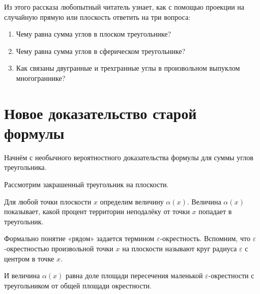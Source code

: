 \documentclass[12pt]{article} %
\theoremstyle{definition} %
\begin{document}
Из этого рассказа любопытный читатель узнает, как с помощью проекции на случайную прямую или плоскость ответить на три вопроса:

\begin{enumerate}
\item Чему равна сумма углов в плоском треугольнике?

\item Чему равна сумма углов в сферическом треугольнике?

\item Как связаны двугранные и трехгранные углы в произвольном выпуклом многограннике?
\end{enumerate}


\section{Новое доказательство старой формулы}

Начнём с необычного вероятностного доказательства формулы для суммы углов треугольника. 

Рассмотрим закрашенный треугольник на плоскости. 

\begin{minipage}{0.99\textwidth}
\begin{center}
\end{center}
\end{minipage}


Для любой точки плоскости $x$ определим величину $\alpha(x)$. 
Величина $\alpha(x)$ показывает, какой процент территории неподалёку от точки $x$ попадает в треугольник. 

Формально понятие «рядом» задается термином $\varepsilon$-окрестность. 
Вспомним, что $\varepsilon$-окрестностью произвольной точки $x$ на плоскости называют круг радиуса $\varepsilon$ с центром в точке $x$.

И величина $\alpha(x)$ равна доле площади пересечения маленькой $\varepsilon$-окрестности 
с треугольником от общей площади окрестности. 
\end{document}
